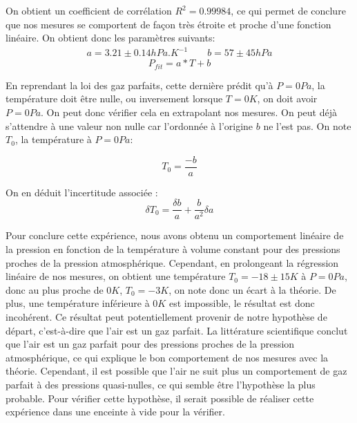 \documentclass[12pt]{article}
\begin{document}
On obtient un coefficient de corrélation $R^2 = 0.99984$, ce qui permet de conclure que nos mesures se comportent de façon très étroite et proche d'une fonction linéaire. On obtient donc les paramètres suivants:
\begin{align*}
	a = 3.21 \pm 0.14 hPa.K^{-1} \quad \quad b = 57 \pm 45 hPa
\end{align*}
\begin{equation*}
	P_{fit} = a * T + b
\end{equation*}

En reprendant la loi des gaz parfaits, cette dernière prédit qu'à $P = 0Pa$, la température doit être nulle, ou inversement lorsque $T = 0K$, on doit avoir $P=0Pa$. On peut donc vérifier cela
en extrapolant nos mesures. On peut déjà s'attendre à une valeur non nulle car l'ordonnée à l'origine $b$ ne l'est pas. On note $T_0$, la température à $P=0Pa$:

\begin{equation}
	T_0 = \frac{-b}{a}
\end{equation}

On en déduit l'incertitude associée :
\begin{equation}
	\delta T_0 = \frac{\delta b}{a} + \frac{b}{a^2} \delta a
\end{equation}

\newpage
Pour conclure cette expérience, nous avons obtenu un comportement linéaire de la pression en fonction de la température à volume constant pour des pressions proches de la pression atmosphérique.
Cependant, en prolongeant la régression linéaire de nos mesures, on obtient une température $T_0 = -18 \pm 15 K$ à $P=0Pa$, donc au plus proche de $0K$, $T_0 = -3K$, on note donc un écart à la théorie.
De plus, une température inférieure à $0K$ est impossible, le résultat est donc incohérent. Ce résultat peut potentiellement provenir de notre hypothèse de départ, c'est-à-dire que l'air est un gaz parfait. 
La littérature scientifique conclut que l'air est un gaz parfait pour des pressions proches de la pression atmosphérique, ce qui explique le bon comportement
de nos mesures avec la théorie. Cependant, il est possible que l'air ne suit plus un comportement de gaz parfait à des pressions quasi-nulles, ce qui semble être l'hypothèse la plus probable. 
Pour vérifier cette hypothèse, il serait possible de réaliser cette expérience dans une enceinte à vide pour la vérifier. 
\end{document}
